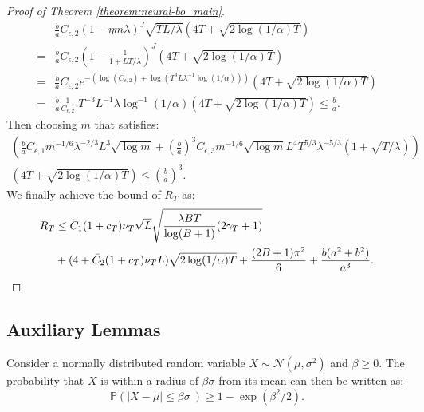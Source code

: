 \begin{proof} [Proof of Theorem \ref{theorem:neural-bo_main}]
\begin{equation*}
\begin{split}
      &\frac{b}{a} C_{\epsilon,2}(1 - \eta m \lambda)^J \sqrt{TL/\lambda} \left(4T+\sqrt{2 \log(1/\alpha)T}\right)\\
    = & \frac{b}{a} C_{\epsilon,2} \left(1-\frac{1}{1+LT/\lambda}\right)^{J} \left(4T+\sqrt{2 \log(1/\alpha)T}\right) \\
    = & \frac{b}{a} C_{\epsilon,2} e^{-\left(\log \left(C_{\epsilon,2}\right) + \log(T^3L\lambda^{-1}\log(1/\alpha)) \right)} \left(4T+\sqrt{2 \log(1/\alpha)T}\right)\\
    = & \frac{b}{a}  \frac{1}{C_{\epsilon,2}}.T^{-3}L^{-1}\lambda \log^{-1}(1/\alpha) \left(4T+\sqrt{2 \log(1/\alpha)T}\right)  \le   \frac{b}{a}.
\end{split}
\end{equation*}
Then choosing $m$ that satisfies:
\begin{equation*}
    \begin{split}
        \left(\frac{b}{a} C_{\epsilon,1} m^{-1/6}\lambda^{-2/3}L^3 \sqrt{\log m} + \left(\frac{b}{a}\right)^3 C_{\epsilon,3} m^{-1/6} \sqrt{\log m} L^4 T^{5/3} \lambda^{-5/3} (1+\sqrt{T/\lambda})\right) \\
        \left(4T+  \sqrt{2 \log(1/\alpha)T}\right) \le \left(\frac{b}{a}\right)^3. 
    \end{split}
\end{equation*}
We finally achieve the bound of $R_T$ as:
\begin{align*}
R_T & \leq \Bar C_1(1+c_T)\nu_T \sqrt{L} \sqrt{\frac{\lambda BT}{\log(B+1)} (2\gamma_T+1)}  \\
     & +  (4+ \bar C_2(1+c_T)\nu_T L)\sqrt{2 \log(1/\alpha)T} + \frac{(2B+1)\pi^2}{6} + \frac{b(a^2+b^2)}{a^3}.
\end{align*}
\end{proof}

\subsection{Auxiliary Lemmas}
\label{section:neural-bo_aux_appendix}

\begin{auxlemma}
\label{lemma:neural-bo_gauss_concetration}
Consider a normally distributed random variable $X \sim \mathcal{N}(\mu, \sigma^2)$ and $\beta \geq 0$. The probability that $X$ is within a radius of $\beta \sigma$ from its mean can then be written as:
\[ \mathbb{P}(\lvert X - \mu\rvert \leq \beta  \sigma\ ) \geq 1-\exp(\beta^2/2).\]
\end{auxlemma}

